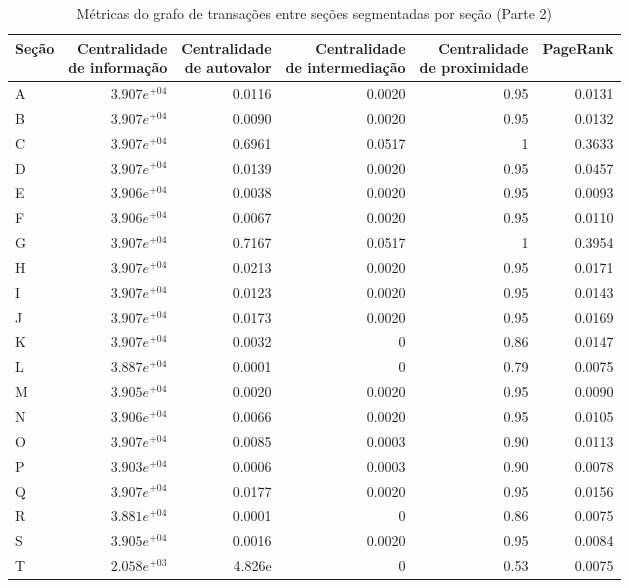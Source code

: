 \begin{table}[htb]
\centering
\caption{Métricas do grafo de transações entre seções segmentadas por seção (Parte 2)}
\label{tab:metricas-redes:grafo-por-secao-especificas2}
    \begin{tabular}{l|rrrrr}
    \toprule
    Seção & \shortstack{Centralidade\\de informação} &  \shortstack{Centralidade\\de autovalor} &   \shortstack{Centralidade\\de intermediação} & \shortstack{Centralidade\\de proximidade} & PageRank \\
    \midrule
    A & $3.907e^{+04}$ &  0.0116 &  0.0020 &  0.95 &  0.0131 \\
    B & $3.907e^{+04}$ &  0.0090 &  0.0020 &  0.95 &  0.0132 \\
    C & $3.907e^{+04}$ &  0.6961 &  0.0517 &  1    &  0.3633 \\
    D & $3.907e^{+04}$ &  0.0139 &  0.0020 &  0.95 &  0.0457 \\
    E & $3.906e^{+04}$ &  0.0038 &  0.0020 &  0.95 &  0.0093 \\
    F & $3.906e^{+04}$ &  0.0067 &  0.0020 &  0.95 &  0.0110 \\
    G & $3.907e^{+04}$ &  0.7167 &  0.0517 &  1    &  0.3954 \\
    H & $3.907e^{+04}$ &  0.0213 &  0.0020 &  0.95 &  0.0171 \\
    I & $3.907e^{+04}$ &  0.0123 &  0.0020 &  0.95 &  0.0143 \\
    J & $3.907e^{+04}$ &  0.0173 &  0.0020 &  0.95 &  0.0169 \\
    K & $3.907e^{+04}$ &  0.0032 &  0      &  0.86 &  0.0147 \\
    L & $3.887e^{+04}$ &  0.0001 &  0      &  0.79 &  0.0075 \\
    M & $3.905e^{+04}$ &  0.0020 &  0.0020 &  0.95 &  0.0090 \\
    N & $3.906e^{+04}$ &  0.0066 &  0.0020 &  0.95 &  0.0105 \\
    O & $3.907e^{+04}$ &  0.0085 &  0.0003 &  0.90 &  0.0113 \\
    P & $3.903e^{+04}$ &  0.0006 &  0.0003 &  0.90 &  0.0078 \\
    Q & $3.907e^{+04}$ &  0.0177 &  0.0020 &  0.95 &  0.0156 \\
    R & $3.881e^{+04}$ &  0.0001 &  0      &  0.86 &  0.0075 \\
    S & $3.905e^{+04}$ &  0.0016 &  0.0020 &  0.95 &  0.0084 \\
    T & $2.058e^{+03}$ &  4.826e &  0      &  0.53 &  0.0075 \\
    \bottomrule
    \end{tabular}
\fdadospesquisa
\end{table}

